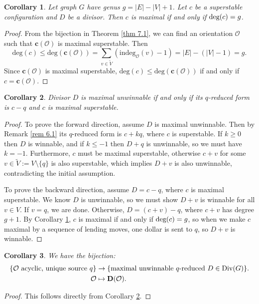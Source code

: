 \documentclass[openany, amssymb, psamsfonts]{amsart}
\newtheorem{cor}{Corollary}[section]
\theoremstyle{definition}
\numberwithin{equation}{section}
\begin{document}
\begin{cor}
\label{cor 7.1}
Let graph $G$ have genus $g=|E|-|V|+1$. Let $c$ be a superstable configuration and $D$ be a divisor. Then $c$ is maximal if and only if $\textup{deg}(c)=g$.
\end{cor}
\begin{proof}
From the bijection in Theorem \ref{thm 7.1}, we can find an orientation $\mathcal{O}$ such that $\textbf{c}(\mathcal{O})$ is maximal superstable. Then 
\[\text{deg}(c)\leq \text{deg}(\textbf{c}(\mathcal{O}))=\sum_{v\in \tilde{V}}(\text{indeg}_{\mathcal{O}}(v)-1)=|E|-(|V|-1)=g.\]
Since $\textbf{c}(\mathcal{O})$ is maximal superstable, $\text{deg}(c)\leq \text{deg}(\textbf{c}(\mathcal{O}))$ if and only if $c=\textbf{c}(\mathcal{O})$.
\end{proof}

\begin{cor}
\label{cor 7.2}
Divisor $D$ is maximal unwinnable if and only if its $q$-reduced form is $c-q$ and $c$ is maximal superstable.
\end{cor}
\begin{proof}
To prove the forward direction, assume $D$ is maximal unwinnable. Then by Remark \ref{rem 6.1} its $q$-reduced form is $c+kq$, where $c$ is superstable. If $k\geq 0$ then $D$ is winnable, and if $k\leq-1$ then $D+q$ is unwinnable, so we must have $k=-1$. Furthermore, $c$ must be maximal superstable, otherwise $c+v$ for some $v\in \tilde{V}:=V\setminus \{q\}$ is also superstable, which implies $D+v$ is also unwinnable, contradicting the initial assumption.

To prove the backward direction, assume $D=c-q$, where $c$ is maximal superstable. We know $D$ is unwinnable, so we must show $D+v$ is winnable for all $v\in V$. If $v=q$, we are done. Otherwise, $D=(c+v)-q$, where $c+v$ has degree $g+1$. By Corollary \ref{cor 7.1}, $c$ is maximal if and only if $\textup{deg}(c)=g$, so when we make $c$ maximal by a sequence of lending moves, one dollar is sent to $q$, so $D+v$ is winnable.
\end{proof}

\begin{cor}
\label{cor 7.3}
We have the bijection:
\begin{align*}
    \{\mathcal{O}\text{ acyclic, unique source $q$}\} &\rightarrow \{\text{maximal unwinnable }q\text{-reduced }D\in \textup{Div}(G)\}.\\
    \mathcal{O}&\mapsto \textbf{D}(\mathcal{O}).
\end{align*}
\end{cor}
\begin{proof}
This follows directly from Corollary \ref{cor 7.2}.
\end{proof}
\end{document}
